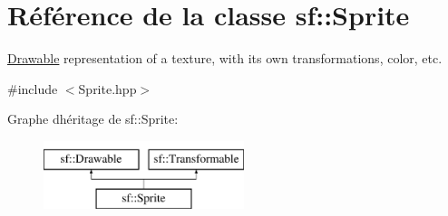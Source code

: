 \hypertarget{classsf_1_1Sprite}{}\section{Référence de la classe sf\+:\+:Sprite}
\label{classsf_1_1Sprite}


\hyperlink{classsf_1_1Drawable}{Drawable} representation of a texture, with its own transformations, color, etc.  




{\ttfamily \#include $<$Sprite.\+hpp$>$}

Graphe d\textquotesingle{}héritage de sf\+:\+:Sprite\+:\begin{figure}[H]
\begin{center}
\leavevmode
\includegraphics[height=2.000000cm]{classsf_1_1Sprite}
\end{center}
\end{figure}
